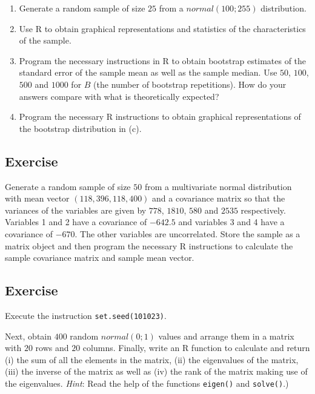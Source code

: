 \documentclass[
]{book}
\begin{document}
\begin{enumerate}
\def\labelenumi{(\alph{enumi})}
\item
  Generate a random sample of size \(25\) from a \(normal (100; 255)\) distribution.
\item
  Use R to obtain graphical representations and statistics of the characteristics of the sample.
\item
  Program the necessary instructions in R to obtain bootstrap estimates of the standard error of the sample mean as well as the sample median. Use \(50\), \(100\), \(500\) and \(1000\) for \(B\) (the number of bootstrap repetitions). How do your answers compare with what is theoretically expected?
\item
  Program the necessary R instructions to obtain graphical representations of the bootstrap distribution in (c).
\end{enumerate}

\subsection{Exercise}\label{exercise-6}

Generate a random sample of size \(50\) from a multivariate normal distribution with mean vector \((118, 396, 118, 400)\) and a covariance matrix so that the variances of the variables are given by \(778\), \(1810\), \(580\) and \(2535\) respectively. Variables 1 and 2 have a covariance of \(-642.5\) and variables 3 and 4 have a covariance of \(-670\). The other variables are uncorrelated. Store the sample as a matrix object and then program the necessary R instructions to calculate the sample covariance matrix and sample mean vector.

\subsection{Exercise}\label{exercise-7}

Execute the instruction \texttt{set.seed(101023)}.

Next, obtain \(400\) random \(normal (0; 1)\) values and arrange them in a matrix with \(20\) rows and \(20\) columns. Finally, write an R function to calculate and return (i) the sum of all the elements in the matrix, (ii) the eigenvalues of the matrix, (iii) the inverse of the matrix as well as (iv) the rank of the matrix {making use of the eigenvalues}. \emph{Hint}: Read the help of the functions \texttt{eigen()} and \texttt{solve()}.)
\end{document}
